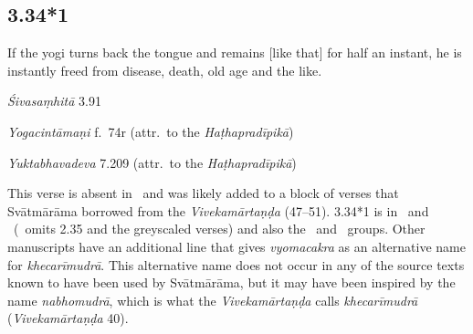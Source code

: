 \begin{ekdosis}
\subsection*{3.34*1}
\begin{translation}[hp03_034_1]
If the yogi turns back the tongue and remains [like that] for half an instant, he is instantly freed from disease, death, old age and the like.
\end{translation}

\begin{sources}[hp03_034_1]
\emph{Śivasaṃhitā} 3.91
\begin{versinnote}
\end{versinnote}
\end{sources}

\begin{testimonia}[hp03_034_1]
\emph{Yogacintāmaṇi} f.~74r (attr.~to the \emph{Haṭhapradīpikā})
\begin{versinnote}
\end{versinnote}

\emph{Yuktabhavadeva} 7.209 (attr.~to the \emph{Haṭhapradīpikā})
\begin{versinnote}
\end{versinnote}
\end{testimonia}

\begin{philcomm}[hp03_034_1]
This verse is absent in \alphaOne\ and was likely added to a block of verses that Svātmārāma borrowed from the \textit{Vivekamārtaṇḍa} (47–51). 3.34*1 is in \alphaTwo\ and \alphaThree\ (\alphaOne\ omits 2.35 and the greyscaled verses) and also the \textgamma\ and \texteta\ groups. Other manuscripts have an additional line that gives \emph{vyomacakra} as an alternative name for \emph{khecarīmudrā}. This alternative name does not occur in any of the source texts known to have been used by Svātmārāma, but it may have been inspired by the name \emph{nabhomudrā}, which is what the \emph{Vivekamārtaṇḍa} calls \emph{khecarīmudrā} (\emph{Vivekamārtaṇḍa} 40).   
\end{philcomm}


\end{ekdosis}
